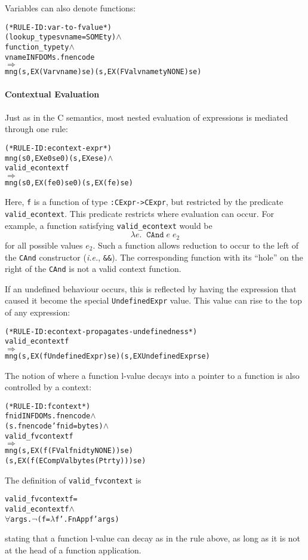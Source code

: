 \documentclass[11pt]{article}
\newcommand{\ie}{\emph{i.e.}}
\begin{document}
Variables can also denote functions:
\begin{alltt}
(* RULE-ID: var-to-fvalue *)
     (lookup_type s vname = SOME ty) \(\land\)
     function_type ty \(\land\)
     vname IN FDOM s.fnencode
   \(\Rightarrow\)
     mng (s, EX (Var vname) se) (s, EX (FVal vname ty NONE) se)
\end{alltt}


\paragraph{Contextual Evaluation}
Just as in the C semantics, most nested evaluation of expressions is
mediated through one rule: \label{rule:econtext-expr}
\begin{alltt}
(* RULE-ID: econtext-expr *)
     mng (s0, EX e0 se0) (s, EX e se) \(\land\)
     valid_econtext f
   \(\Rightarrow\)
     mng (s0, EX (f e0) se0) (s, EX (f e) se)
\end{alltt}
Here, \texttt{f} is a function of type \texttt{:CExpr->CExpr},
but restricted by the predicate \texttt{valid_econtext}.  This
predicate restricts where evaluation can occur.  For example, a
function satisfying \texttt{valid_econtext} would be 
\[
\lambda e.\;\;\texttt{CAnd}\;e\;e_2
\]
for all possible values $e_2$.  Such a function allows reduction to
occur to the left of the \texttt{CAnd} constructor (\ie,
\texttt{\&\&}).  The corresponding function with its ``hole'' on the
right of the \texttt{CAnd} is not a valid context function.

If an undefined behaviour occurs, this is reflected by having the
expression that caused it become the special \texttt{UndefinedExpr}
value.  This value can rise to the top of any expression:
\begin{alltt}
(* RULE-ID: econtext-propagates-undefinedness *)
     valid_econtext f
   \(\Rightarrow\)
     mng (s, EX (f UndefinedExpr) se) (s, EX UndefinedExpr se)
\end{alltt}

The notion of where a function l-value decays into a pointer to a
function is also controlled by a context:
\begin{alltt}
(* RULE-ID: fcontext *)
     fnid IN FDOM s.fnencode \(\land\)
     (s.fnencode ' fnid = bytes) \(\land\)
     valid_fvcontext f
   \(\Rightarrow\)
     mng (s, EX (f (FVal fnid ty NONE)) se) 
         (s, EX (f (ECompVal bytes (Ptr ty))) se)
\end{alltt}
The definition of \texttt{valid_fvcontext} is 
\begin{alltt}
   valid_fvcontext f =
      valid_econtext f \(\land\)
      \(\forall\)args. \(\neg\)(f = \(\lambda\)f'. FnApp f' args)
\end{alltt}
stating that a function l-value can decay as in the rule above, as
long as it is not at the head of a function application.
\end{document}
